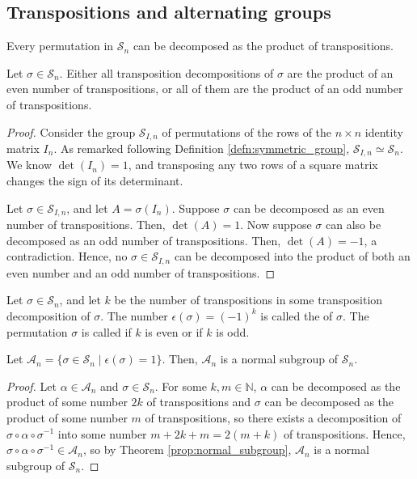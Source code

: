 \subsection*{Transpositions and alternating groups}

\begin{cor}
Every permutation in $ \mathcal{S}_n $ can be decomposed as the product of transpositions.
\end{cor}

\begin{prop}
Let $ \sigma\in\mathcal{S}_n $. Either all transposition decompositions of $ \sigma $ are the product of an even number of transpositions, or all of them are the product of an odd number of transpositions.
\end{prop}
\begin{proof}
Consider the group $ \mathcal{S}_{I,n} $ of permutations of the rows of the $ n\times n $ identity matrix $ I_n $. As remarked following Definition \ref{defn:symmetric_group}, $ \mathcal{S}_{I,n}\simeq\mathcal{S}_n $. We know $ \det(I_n)=1 $, and transposing any two rows of a square matrix changes the sign of its determinant.

Let $ \sigma\in\mathcal{S}_{I,n} $, and let $ A=\sigma(I_n) $. Suppose $ \sigma $ can be decomposed as an even number of transpositions. Then, $ \det(A)=1 $. Now suppose $ \sigma $ can also be decomposed as an odd number of transpositions. Then, $ \det(A)=-1 $, a contradiction. Hence, no $ \sigma\in\mathcal{S}_{I,n} $ can be decomposed into the product of both an even number and an odd number of transpositions.
\end{proof}

\begin{defn}
Let $ \sigma\in\mathcal{S}_n $, and let $ k $ be the number of transpositions in some transposition decomposition of $ \sigma $. The number $ \epsilon(\sigma)=(-1)^k $ is called the  of $ \sigma $. The permutation $ \sigma $ is called  if $ k $ is even or  if $ k $ is odd.
\end{defn}

\begin{prop}\label{prop:alternating_group}
Let $ \mathcal{A}_n=\{\sigma\in\mathcal{S}_n\mid\epsilon(\sigma)=1\} $. Then, $ \mathcal{A}_n $ is a normal subgroup of $ \mathcal{S}_n $.
\end{prop}
\begin{proof}
Let $ \alpha\in\mathcal{A}_n $ and $ \sigma\in\mathcal{S}_n $. For some $ k,m\in\mathbb{N} $, $ \alpha $ can be decomposed as the product of some number $ 2k $ of transpositions and $ \sigma $ can be decomposed as the product of some number $ m $ of transpositions, so there exists a decomposition of $ \sigma\circ\alpha\circ\sigma^{-1} $ into some number $ m+2k+m=2(m+k) $ of transpositions. Hence, $ \sigma\circ\alpha\circ\sigma^{-1}\in\mathcal{A}_n $, so by Theorem \ref{prop:normal_subgroup}, $ \mathcal{A}_n $ is a normal subgroup of $ \mathcal{S}_n $.
\end{proof}

